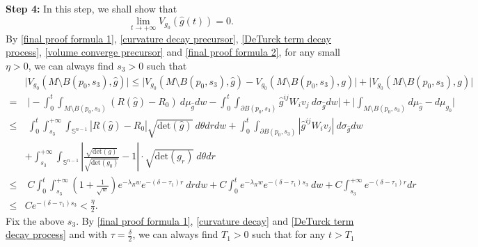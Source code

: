 \documentclass[12pt]{amsart}
\begin{document}
\textbf{Step 4: } In this step, we shall show that 
\begin{equation}\label{limit of relative volume}
    \lim_{t\rightarrow +\infty} V_{g_0}(\hat{g}(t)) = 0.
\end{equation}
By \eqref{final proof formula 1}, \eqref{curvature decay precursor}, \eqref{DeTurck term decay process}, \eqref{volume converge precursor} and \eqref{final proof formula 2}, for any small $\eta > 0$, we can always find $s_3 > 0$ such that 
\begin{equation}\label{limit of relative volume formula 1}
    \begin{split}
        &\Big|V_{g_0}(M\setminus B(p_0, s_3), \hat{g}) \Big| \leq \Big|V_{g_0}(M\setminus B(p_0, s_3), \hat{g}) - V_{g_0}(M \setminus B(p_0, s_3), g)\Big| + \Big| V_{g_0}(M \setminus B(p_0, s_3), g)\Big|\\
        =&\; \big|-\int_{0}^{t}\int_{M\setminus B(p_0, s_3)}(R(\hat{g}) - R_0)\ d\mu_{\hat{g}} dw - \int_{0}^{t} \int_{\partial B(p_0, s_3)} \hat{g}^{ij}W_i v_j\ d\sigma_{\hat{g}}dw \Big|+ \Big|\int_{M \setminus B(p_0, s_3)} d\mu_{\hat{g}} - d\mu_{g_0}\big|\\
        \leq&\;\int_{0}^{t}\int_{s_3}^{+\infty}\int_{\mathbb{S}^{n - 1}}|R(\hat{g}) - R_0|\sqrt{\mathrm{det}(\hat{g})}\ d\theta dr dw + \int_{0}^{t} \int_{\partial B(p_0, s_3)} |\hat{g}^{ij}W_i v_j|\ d\sigma_{\hat{g}}dw\\ 
        &+ \int_{s_3}^{+\infty}\int_{\mathbb{S}^{n - 1}}|\frac{\sqrt{\mathrm{det}(g)}}{\sqrt{\mathrm{det}(g_0)}} - 1|\cdot \sqrt{\mathrm{det}(g_r)}\ d\theta dr\\
        \leq&\; C\int_{0}^{t}\int_{s_3}^{+\infty}(1 + \frac{1}{\sqrt{w}}) e^{-\lambda_R w} e^{-(\delta - \tau_1)r}\ drdw + C\int_{0}^{t}e^{-\lambda_R w}e^{-(\delta - \tau_1)s_3}\ dw + C\int_{s_3}^{+\infty} e^{-(\delta - \tau_1)r} dr\\
        \leq& Ce^{-(\delta - \tau_1) s_3} < \frac{\eta}{2}.  
    \end{split}
\end{equation}
Fix the above $s_3$. By \eqref{final proof formula 1}, \eqref{curvature decay} and \eqref{DeTurck term decay process} and  with $\tau = \frac{\delta}{2}$, we can always find $T_1 > 0$ such that for any $t > T_1$
\end{document}
